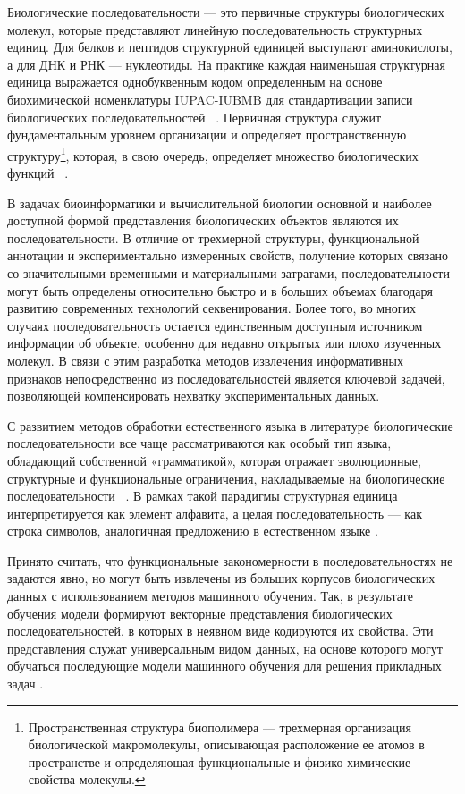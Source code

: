 \documentclass[specification,annotation,times]{itmo-student-thesis}
\begin{document}
Биологические последовательности --- это первичные структуры биологических молекул, которые представляют линейную последовательность структурных единиц. Для белков и пептидов структурной единицей выступают аминокислоты, а для ДНК и РНК --- нуклеотиды. На практике каждая наименьшая структурная единица выражается однобуквенным кодом определенным на основе биохимической номенклатуры IUPAC-IUBMB для стандартизации записи биологических последовательностей ~\cite{markley1998recommendations}. Первичная структура служит фундаментальным уровнем организации и определяет пространственную структуру\footnote{Пространственная структура биополимера — трехмерная организация биологической макромолекулы, описывающая расположение ее атомов в пространстве и определяющая функциональные и физико-химические свойства молекулы.}, которая, в свою очередь, определяет множество биологических функций ~\cite{alley2019unified}.

В задачах биоинформатики и вычислительной биологии основной и наиболее доступной формой представления биологических объектов являются их последовательности. В отличие от трехмерной структуры, функциональной аннотации и экспериментально измеренных свойств, получение которых связано со значительными временными и материальными затратами, последовательности могут быть определены относительно быстро и в больших объемах благодаря развитию современных технологий секвенирования. Более того, во многих случаях последовательность остается единственным доступным источником информации об объекте, особенно для недавно открытых или плохо изученных молекул. В связи с этим разработка методов извлечения информативных признаков непосредственно из последовательностей является ключевой задачей, позволяющей компенсировать нехватку экспериментальных данных.

С развитием методов обработки естественного языка в литературе биологические последовательности все чаще рассматриваются как особый тип языка, обладающий собственной «грамматикой», которая отражает эволюционные, структурные и функциональные ограничения, накладываемые на биологические последовательности ~\cite{elnaggar2021prottrans, heinzinger2019modeling}. В рамках такой парадигмы структурная единица интерпретируется как элемент алфавита, а целая последовательность — как строка символов, аналогичная предложению в естественном языке \cite{ofer2021language}.

Принято считать, что функциональные закономерности в последовательностях не задаются явно, но могут быть извлечены из больших корпусов биологических данных с использованием методов машинного обучения. Так, в результате обучения модели формируют векторные представления биологических последовательностей, в которых в неявном виде кодируются их свойства. Эти представления служат универсальным видом данных, на основе которого могут обучаться последующие модели машинного обучения для решения прикладных задач \cite{elnaggar2021prottrans, lin2023evolutionary}.
\end{document}
